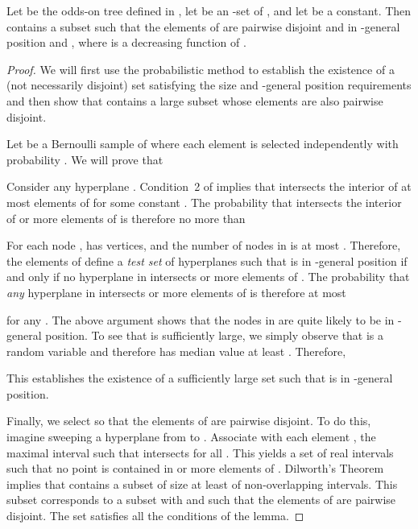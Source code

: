 \documentclass{patmorin}
\begin{document}
\begin{lem}
  Let  be the odds-on tree defined in
  , let  be an -set of ,
  and let  be a constant.  Then  contains a subset  such that the elements of  are pairwise disjoint and  in
  -general position and ,
  where  is a decreasing function of .
\end{lem}

\begin{proof}
  We will first use the probabilistic method \cite{as08} to establish
  the existence of a (not necessarily disjoint) set  satisfying the
  size and -general position requirements and then show that 
  contains a large subset  whose elements are also pairwise disjoint.

  Let  be a Bernoulli sample of  where each element is selected
  independently with probability . We
  will prove that
  
  Consider any hyperplane . Condition~2 of
   implies that  intersects the
  interior of at most  elements of  for some
  constant .  The probability that  intersects the interior of
   or more elements of  is therefore no more than
  
  For each node ,  has 
  vertices, and the number of nodes in  is at most .
  Therefore, the elements of  define a \emph{test set}  of
   hyperplanes such that
   is in -general position if and only if no hyperplane in
   intersects  or more elements of . The probability
  that \emph{any} hyperplane in  intersects  or more elements of
   is therefore at most
  
  for any .
  The above argument shows that the nodes in
   are quite likely to be in -general position. To see that
   is sufficiently large, we simply observe that  is a
   random variable and therefore has median
  value at least .
  Therefore,
  
  This establishes the existence of a sufficiently large set 
  such that  is in -general position.

  Finally, we select  so that the elements of
   are pairwise disjoint.  To do this, imagine
  sweeping a hyperplane  from
   to .  Associate with each element , the
  maximal interval  such that  intersects 
  for all . This yields a set  of real intervals
  such that no point is contained in  or more elements of .
  Dilworth's Theorem \cite{d50} implies that  contains a subset
  of size at least  of non-overlapping intervals. This subset
  corresponds to a subset  with 
  and such that the elements of  are pairwise
  disjoint. The set  satisfies all the conditions of the lemma.
\end{proof}
\end{document}
